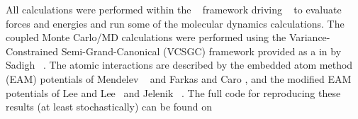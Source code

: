 All calculations were performed within the ~\cite{pyiron, pyiron-paper} framework driving ~\cite{lammps, plimpton1995fast} to evaluate forces and energies and run some of the molecular dynamics calculations.
The coupled Monte Carlo/MD calculations were performed using the Variance-Constrained Semi-Grand-Canonical (VCSGC) framework provided as a  in  by Sadigh \etal~\cite{sadigh2012calculation, sadigh2012scalable}.
The atomic interactions are described by the embedded atom method (EAM) potentials of Mendelev \etal~\cite{mendelev2005effect} and Farkas and Caro \cite{farkas2020model}, and the modified EAM potentials of Lee and Lee~\cite{lee2010modified} and Jelenik \etal~\cite{jelinek2012modified}.
The full code for reproducing these results (at least stochastically) can be found on ~\cite{feal}